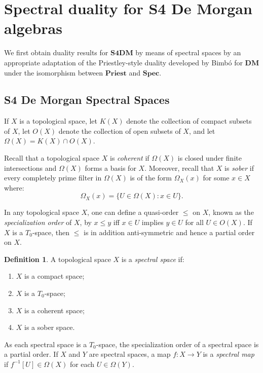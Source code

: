 \documentclass{amsart}
\theoremstyle{plain}
\theoremstyle{definition}
\newtheorem{definition}[theorem]{Definition}
\begin{document}
 



\section{Spectral duality for S4 De Morgan algebras}
We first obtain duality results for $\mathbf{S4DM}$ by means of spectral spaces by an appropriate adaptation of the Priestley-style duality developed by Bimb\'o \cite{bimbo} for $\mathbf{DM}$ under the isomorphism between $\mathbf{Priest}$ and $\mathbf{Spec}$. 
\subsection{S4 De Morgan Spectral Spaces}
If $X$ is a topological space, let ${K}(X)$ denote the collection of compact subsets of $X$, let  $O(X)$ denote the collection of open subsets of $X$, and let $\Omega(X)=K(X)\cap O(X)$.  

 Recall that a topological space $X$ is \emph{coherent} if $\Omega(X)$ is closed under finite intersections and $\Omega(X)$ forms a basis for $X$. Moreover, recall that $X$ is \emph{sober} if every completely prime filter in $\Omega(X)$ is of the form $\Omega_X(x)$ for some $x\in X$ where: \[\Omega_X(x)=\{U\in\Omega(X):x\in U\}.\] 
 
 In any topological space $X$, one can define a quasi-order $\leqslant$ on $X$, known as the \emph{specialization order} of $X$, by $x\leqslant y$ iff $x\in U$ implies $y\in U$ for all $U\in O(X)$. If $X$ is a $T_0$-space, then $\leqslant$ is in addition anti-symmetric and hence a partial order on $X$.
 \begin{definition}
     A topological space $X$ is a \emph{spectral space} if: 
     \begin{enumerate}
     \item $X$ is a compact space; 
         \item $X$ is a $T_0$-space; 
         \item $X$ is a coherent space; 
         \item $X$ is a sober space. 
     \end{enumerate}
 \end{definition}
 

 
 As each spectral space is a $T_0$-space, the specialization order of a spectral space is a partial order. If $X$ and $Y$ are spectral spaces, a map $f\colon X\to Y$ is a \emph{spectral map} if $f^{-1}[U]\in \Omega(X)$ for each $U\in \Omega(Y)$. 
\end{document}
